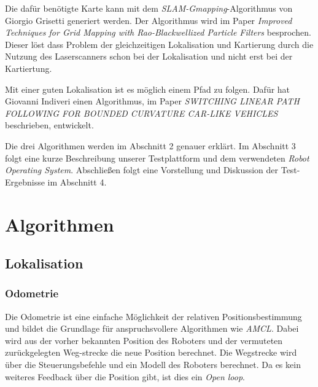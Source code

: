 \documentclass[11pt,a4paper]{article}
\begin{document}
	Die daf\"ur ben\"otigte Karte kann mit dem \textit{SLAM-Gmapping}-Algorithmus von Giorgio Grisetti generiert werden. Der Algorithmus wird im Paper \textit{Improved Techniques for Grid Mapping
	with Rao-Blackwellized Particle Filters} \cite{Gmapping} besprochen. Dieser l\"ost dass Problem der gleichzeitigen Lokalisation und Kartierung durch die Nutzung des Laserscanners schon bei der Lokalisation und nicht erst bei der Kartiertung. 
	
	Mit einer guten Lokalisation ist es m\"oglich einem Pfad zu folgen. Daf\"ur hat Giovanni Indiveri einen Algorithmus, im Paper \textit{SWITCHING
	LINEAR PATH FOLLOWING FOR
	BOUNDED CURVATURE CAR-LIKE
	VEHICLES} \cite{Giovanni} beschrieben, entwickelt. 

	Die drei Algorithmen werden im Abschnitt 2 genauer erkl\"art. Im Abschnitt 3 folgt eine kurze Beschreibung unserer Testplattform und dem verwendeten \textit{Robot Operating System}. Abschlie{\ss}en folgt eine Vorstellung und Diskussion der Test-Ergebnisse im Abschnitt 4.
  

\section{Algorithmen}

\subsection{Lokalisation}
\subsubsection{Odometrie}
{
	Die Odometrie ist eine einfache M\"oglichkeit der relativen Positionsbestimmung und bildet die Grundlage f\"ur anspruchsvollere Algorithmen wie \textit{AMCL}. Dabei wird aus der vorher bekannten Position des Roboters und der vermuteten zur\"uckgelegten Weg-strecke die neue Position berechnet. Die Wegstrecke wird \"uber die Steuerungsbefehle und ein Modell des Roboters berechnet. Da es kein weiteres Feedback \"uber die Position gibt, ist dies ein \textit{Open loop}. 
}
\end{document}
